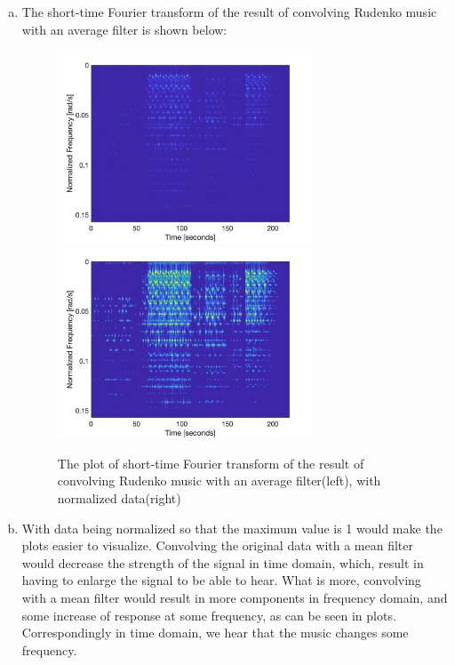 \documentclass[a4paper]{article}
\begin{document}
\begin{spacing}{2.0}
\begin{enumerate}[(a)]
\item The short-time Fourier transform of the result of convolving Rudenko music with an average filter is shown below:
\begin{figure}[H]
\centering
\includegraphics[width=3in]{Q4partc1.jpg}
\includegraphics[width=3in]{Q4partc2.jpg}
\caption{The plot of short-time Fourier transform of the result of convolving Rudenko music with an average filter(left), with normalized data(right)}
\end{figure}

\item With data being normalized so that the maximum value is 1 would make the plots easier to visualize. Convolving the original data with a mean filter would decrease the strength of the signal in time domain, which, result in having to enlarge the signal to be able to hear. What is more, convolving with a mean filter would result in more components in frequency domain, and some increase of response at some frequency, as can be seen in plots. Correspondingly in time domain, we hear that the music changes some frequency.
\end{enumerate}


\end{spacing}
\end{document}
